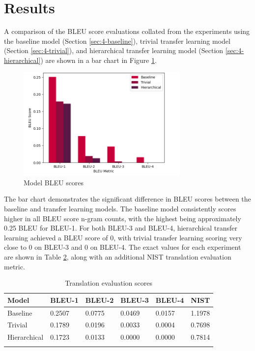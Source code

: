 \newpage
\section{Results}
\label{sec:4-results}

A comparison of the \acrshort{BLEU} score evaluations collated from the experiments using the baseline model (Section \ref{sec:4-baseline}), trivial transfer learning model (Section \ref{sec:4-trivial}), and hierarchical transfer learning model (Section \ref{sec:4-hierarchical}) are shown in a bar chart in Figure \ref{fig:bleu_results}.

\begin{figure}[!ht]
\centering
\includegraphics[width=0.75\textwidth]{media/experiments/bleu/5k_bleu.png}
\captionsetup{justification=centering}
\caption[Model BLEU scores]{Model BLEU scores}
\label{fig:bleu_results}
\end{figure}

The bar chart demonstrates the significant difference in \acrshort{BLEU} scores between the baseline and transfer learning models. The baseline model consistently scores higher in all \acrshort{BLEU} score n-gram counts, with the highest being approximately 0.25 \acrshort{BLEU} for \acrshort{BLEU}-1. For both \acrshort{BLEU}-3 and \acrshort{BLEU}-4, hierarchical transfer learning achieved a \acrshort{BLEU} score of 0, with trivial transfer learning scoring very close to 0 on \acrshort{BLEU}-3 and 0 on \acrshort{BLEU}-4. The exact values for each experiment are shown in Table \ref{tab:bleu_table}, along with an additional \acrshort{NIST} translation evaluation metric.


\begin{table}[!ht]
\centering
\setlength\doublerulesep{2pt}
\renewcommand{\arraystretch}{1.1}
\begin{longtable}{|l|l|l|l|l|l|}
\hline
\textbf{Model} & \textbf{BLEU-1} & \textbf{BLEU-2} & \textbf{BLEU-3} & \textbf{BLEU-4} & \textbf{NIST}\\ \hline
\endhead
%
\hline
\endfoot
%
\endlastfoot
%
Baseline       & 0.2507 & 0.0775 & 0.0469 & 0.0157 & 1.1978 \\
Trivial        & 0.1789 & 0.0196 & 0.0033 & 0.0004 & 0.7698 \\
Hierarchical   & 0.1723 & 0.0133 & 0.0000 & 0.0000 & 0.7814 \\ \hline
\captionsetup{justification=centering}
\caption{Translation evaluation scores}
\label{tab:bleu_table}\\
\end{longtable}
\end{table}

